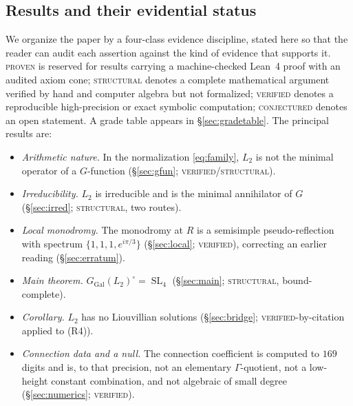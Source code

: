 \documentclass[11pt,reqno]{amsart}
\theoremstyle{plain}
\theoremstyle{definition}
\theoremstyle{remark}
\newcommand{\GGal}{G_{\mathrm{Gal}}}
\newcommand{\SL}{\operatorname{SL}}
\newcommand{\Ltwo}{L_{2}}
\begin{document}
\subsection{Results and their evidential status}\label{sec:grades}
We organize the paper by a four-class evidence discipline, stated here so that
the reader can audit each assertion against the kind of evidence that supports
it. \textsc{proven} is reserved for results carrying a machine-checked Lean~4
proof with an audited axiom cone; \textsc{structural} denotes a complete
mathematical argument verified by hand and computer algebra but not
formalized; \textsc{verified} denotes a reproducible high-precision or exact
symbolic computation; \textsc{conjectured} denotes an open statement. A grade
table appears in \S\ref{sec:gradetable}. The principal results are:

\begin{itemize}
\item[(R1)] \emph{Arithmetic nature.} In the normalization \eqref{eq:family},
$\Ltwo$ is not the minimal operator of a $G$-function (\S\ref{sec:gfun};
\textsc{verified}/\textsc{structural}).
\item[(R2)] \emph{Irreducibility.} $\Ltwo$ is irreducible and is the minimal
annihilator of $G$ (\S\ref{sec:irred}; \textsc{structural}, two routes).
\item[(R3)] \emph{Local monodromy.} The monodromy at $R$ is a semisimple
pseudo-reflection with spectrum $\{1,1,1,e^{i\pi/3}\}$ (\S\ref{sec:local};
\textsc{verified}), correcting an earlier reading (\S\ref{sec:erratum}).
\item[(R4)] \emph{Main theorem.} $\GGal(\Ltwo)^{\circ}=\SL_{4}$
(\S\ref{sec:main}; \textsc{structural}, bound-complete).
\item[(R5)] \emph{Corollary.} $\Ltwo$ has no Liouvillian solutions
(\S\ref{sec:bridge}; \textsc{verified}-by-citation applied to (R4)).
\item[(R6)] \emph{Connection data and a null.} The connection coefficient is
computed to $169$ digits and is, to that precision, not an elementary
$\Gamma$-quotient, not a low-height constant combination, and not algebraic of
small degree (\S\ref{sec:numerics}; \textsc{verified}).
\end{itemize}
\end{document}
